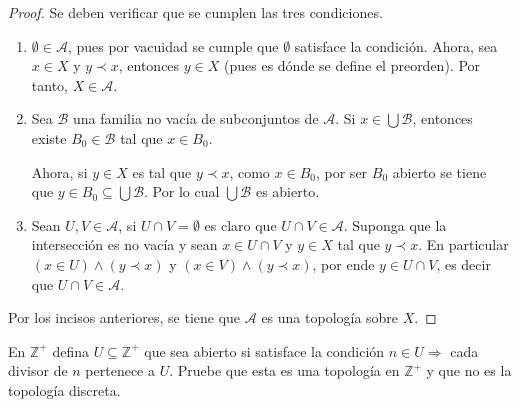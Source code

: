 \documentclass[12pt]{report}
\theoremstyle{largebreak}
\begin{document}
    \begin{proof}
        Se deben verificar que se cumplen las tres condiciones.
        \begin{enumerate}
            \item $\emptyset\in\mathcal{A}$, pues por vacuidad se cumple que $\emptyset$ satisface la condición. Ahora, sea $x\in X$ y $y\prec x$, entonces $y\in X$ (pues es dónde se define el preorden). Por tanto, $X\in\mathcal{A}$.
            \item Sea $\mathcal{B}$ una familia no vacía de subconjuntos de $\mathcal{A}$. Si $x\in\bigcup\mathcal{B}$, entonces existe $B_0\in\mathcal{B}$ tal que $x\in B_0$.
            
            Ahora, si $y\in X$ es tal que $y\prec x$, como $x\in B_0$, por ser $B_0$ abierto se tiene que $y\in B_0\subseteq\bigcup\mathcal{B}$. Por lo cual $\bigcup\mathcal{B}$ es abierto.

            \item Sean $U,V\in\mathcal{A}$, si $U\cap V=\emptyset$ es claro que $U\cap V\in\mathcal{A}$. Suponga que la intersección es no vacía y sean $x\in U\cap V$ y $y\in X$ tal que $y\prec x$. En particular $(x\in U)\land(y\prec x)$ y $(x\in V)\land(y\prec x)$, por ende $y\in U\cap V$, es decir que $U\cap V\in\mathcal{A}$.
        \end{enumerate}
        Por los incisos anteriores, se tiene que $\mathcal{A}$ es una topología sobre $X$.
    \end{proof}

    \begin{excer}
        En $\mathbb{Z}^+$ defina $U\subseteq\mathbb{Z}^+$ que sea abierto si satisface la condición $n\in U\Rightarrow$ cada divisor de $n$ pertenece a $U$. Pruebe que esta es una topología en $\mathbb{Z}^+$ y que no es la topología discreta.
    \end{excer}
\end{document}
